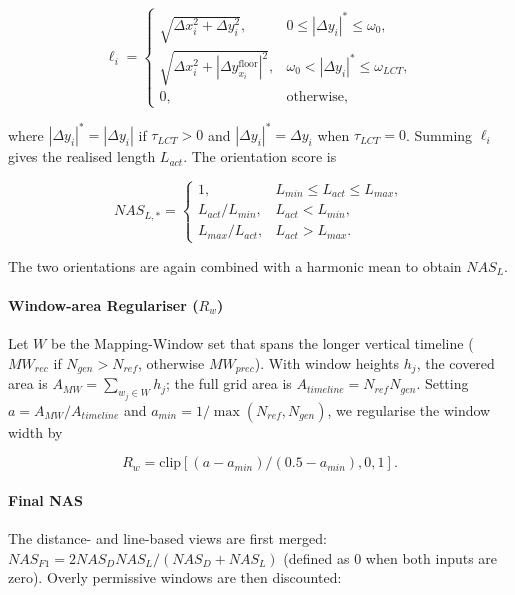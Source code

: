 \documentclass[letterpaper]{article} %
\begin{document}
\begin{equation}
\ell_i = \begin{cases}
\sqrt{\Delta x_i^2 + \Delta y_i^2}, & 0 \leq |\Delta y_i|^* \leq \omega_0, \\
\sqrt{\Delta x_i^2 + |\Delta y_{x_i}^{\text{floor}}|^2}, & \omega_0 < |\Delta y_i|^* \leq \omega_{LCT}, \\
0, & \text{otherwise},
\end{cases}
\end{equation}

where $|\Delta y_i|^* = |\Delta y_i|$ if $\tau_{LCT} > 0$ and $|\Delta y_i|^* = \Delta y_i$ when $\tau_{LCT} = 0$. Summing $\ell_i$ gives the realised length $L_{act}$. The orientation score is

\begin{equation}
NAS_{L,*} = \begin{cases}
1, & L_{min} \leq L_{act} \leq L_{max}, \\
L_{act}/L_{min}, & L_{act} < L_{min}, \\
L_{max}/L_{act}, & L_{act} > L_{max}.
\end{cases}
\end{equation}

The two orientations are again combined with a harmonic mean to obtain $NAS_L$.

\paragraph{Window-area Regulariser ($R_w$)}
Let $W$ be the Mapping-Window set that spans the longer vertical timeline ($MW_{rec}$ if $N_{gen} > N_{ref}$, otherwise $MW_{prec}$). With window heights $h_j$, the covered area is $A_{MW} = \sum_{w_j \in W} h_j$; the full grid area is $A_{timeline} = N_{ref} N_{gen}$. Setting $a = A_{MW}/A_{timeline}$ and $a_{min} = 1/\max(N_{ref}, N_{gen})$, we regularise the window width by

\begin{equation}
R_w = \text{clip}[(a - a_{min})/(0.5 - a_{min}), 0, 1].
\end{equation}

\paragraph{Final NAS}
The distance- and line-based views are first merged: $NAS_{F1} = 2 NAS_D NAS_L/(NAS_D + NAS_L)$ (defined as 0 when both inputs are zero). Overly permissive windows are then discounted:
\end{document}
